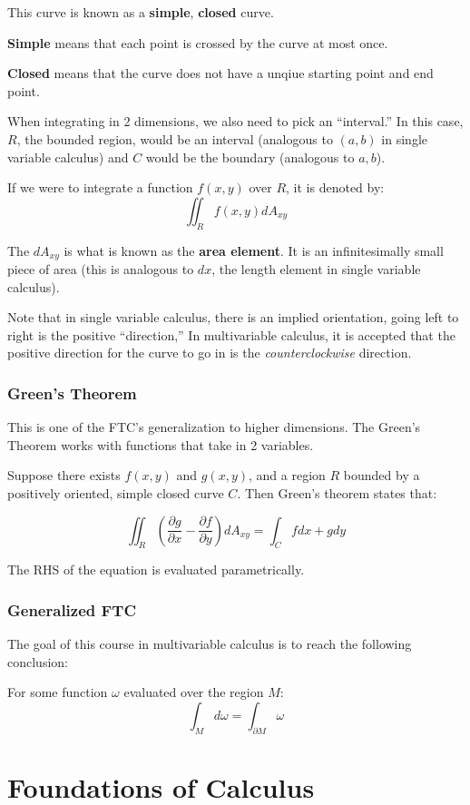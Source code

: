 \documentclass [12 pt, twoside] {book}
\newcommand\+{\text{ }}
\begin{document}
This curve is known as a \textbf{simple}, \textbf{closed} curve.

\textbf{Simple} means that each point is crossed by the curve at most once.

\textbf{Closed} means that the curve does not have a unqiue starting point and
end point.

When integrating in 2 dimensions, we also need to pick an ``interval.'' In this
case, $R$, the bounded region, would be an interval (analogous to $(a,b)$ in
single variable calculus) and $C$ would be the boundary (analogous to $a, b$).

If we were to integrate a function $f(x,y)$ over $R$, it is denoted by:
$$\iint_R f(x,y) dA_{xy}$$

The $dA_{xy}$ is what is known as the \textbf{area element}. It is an
infinitesimally small piece of area (this is analogous to $dx$, the length
element in single variable calculus).

Note that in single variable calculus, there is an implied orientation, going
left to right is the positive ``direction,'' In multivariable calculus, it is
accepted that the positive direction for the curve to go in is the
\textit{counterclockwise} direction.

\subsection*{Green's Theorem}
This is one of the FTC's generalization to higher dimensions. The Green's
Theorem works with functions that take in 2 variables.

Suppose there exists $f(x, y)$ and $g(x, y)$, and a region $R$ bounded by a
positively oriented, simple closed curve $C$. Then Green's theorem states that:

$$\iint_R (\frac{\partial g}{\partial x} - \frac{\partial f}{\partial y}) dA_{xy} =
\int_C fdx + gdy$$

The RHS of the equation is evaluated parametrically.

\subsection*{Generalized FTC}
The goal of this course in multivariable calculus is to reach the following
conclusion:

For some function $\omega$ evaluated over the region $M$:
$$\int_M d\omega = \int_{\partial M} \omega$$
\mainmatter
\chapter{Foundations of Calculus}
\end{document}
